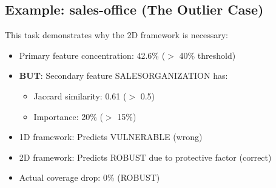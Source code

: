 \subsection{Example: sales-office (The Outlier Case)}

This task demonstrates why the 2D framework is necessary:
\begin{itemize}
    \item Primary feature concentration: 42.6\% ($>$ 40\% threshold)
    \item \textbf{BUT}: Secondary feature SALESORGANIZATION has:
    \begin{itemize}
        \item Jaccard similarity: 0.61 ($>$ 0.5)
        \item Importance: 20\% ($>$ 15\%)
    \end{itemize}
    \item 1D framework: Predicts VULNERABLE (wrong)
    \item 2D framework: Predicts ROBUST due to protective factor (correct)
    \item Actual coverage drop: 0\% (ROBUST)
\end{itemize}
